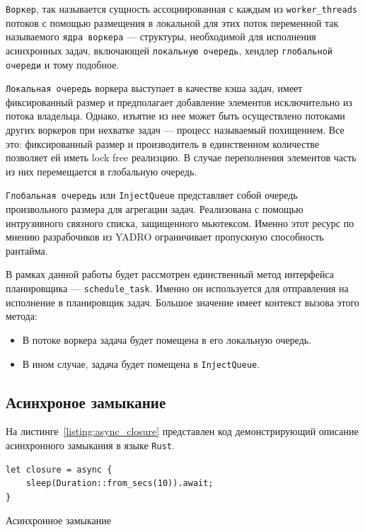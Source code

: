 \verb|Воркер|, так называется сущность ассоциированная с каждым из \verb|worker_threads| потоков с помощью размещения в локальной для этих поток переменной так называемого \verb|ядра воркера| --- структуры, необходимой для исполнения асинхронных задач, включающей \verb|локальную очередь|, хендлер \verb|глобальной очереди| и тому подобное.

\verb|Локальная очередь| воркера выступает в качестве кэша задач, имеет фиксированный размер и предполагает добавление элементов  исключительно из потока владельца. Однако, изъятие из нее может быть осуществлено потоками других воркеров при нехватке задач --- процесс называемый похищением. Все это: фиксированный размер и производитель в единственном количестве позволяет ей иметь lock free реализцию. В случае переполнения элементов часть из них перемещается в глобальную очередь.

\verb|Глобальная очередь| или \verb|InjectQueue| представляет собой очередь произвольного размера для агрегации задач. Реализована с помощью интрузивного связного списка, защищенного мьютексом. Именно этот ресурс по мнению разрабочиков из YADRO ограничивает пропускную способность рантайма.

В рамках данной работы будет рассмотрен единственный метод интерфейса планировщика --- \verb|schedule_task|. Именно он используется для отправления на исполнение в планировщик задач. Большое значение имеет контекст вызова этого метода:

\begin{itemize}
    \item В потоке воркера задача будет помещена в его локальную очередь.
    \item В ином случае, задача будет помещена в \verb|InjectQueue|.
\end{itemize}

\subsection{Асинхроное замыкание}

На листинге~\ref{listing:async_closure} представлен код демонстрирующий описание асинхронного замыкания в языке \verb|Rust|.

\begin{listing}[H]
    \begin{verbatim}
let closure = async {
    sleep(Duration::from_secs(10)).await;
}
    \end{verbatim}

    \caption{Асинхронное замыкание}
    \label{listing:async_closure}
\end{listing}

